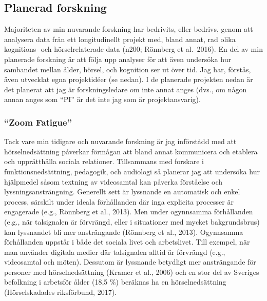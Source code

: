 \documentclass[]{article}
\begin{document}
\hypertarget{planerad-forskning}{%
\subsection{Planerad forskning}\label{planerad-forskning}}

Majoriteten av min nuvarande forskning har bedrivits, eller bedrivs,
genom att analysera data från ett longitudinellt projekt med, bland
annat, rad olika kognitions- och hörselrelaterade data (n200; Rönnberg
et al.~2016). En del av min planerade forskning är att följa upp
analyser för att även undersöka hur sambandet mellan ålder, hörsel, och
kognition ser ut över tid. Jag har, förstås, även utvecklat egna
projektidéer (se nedan). I de planerade projekten nedan är det planerat
att jag är forskningsledare om inte annat anges (dvs., om någon annan
anges som ``PI'' är det inte jag som är projektansvarig).

\hypertarget{zoom-fatigue}{%
\subsubsection{``Zoom Fatigue''}\label{zoom-fatigue}}

Tack vare min tidigare och nuvarande forskning är jag införstådd med att
hörselnedsättning påverkar förmågan att bland annat kommunicera och
etablera och upprätthålla sociala relationer. Tillsammans med forskare i
funktionsnedsättning, pedagogik, och audiologi så planerar jag att
undersöka hur hjälpmedel såsom textning av videosamtal kan påverka
förståelse och lyssningsansträngning. Generellt sett är lyssnande en
automatisk och enkel process, särskilt under ideala förhållanden där
inga explicita processer är engagerade (e.g., Rönnberg et al., 2013).
Men under ogynnsamma förhållanden (e.g., när talsignalen är förvrängd,
eller i situationer med mycket bakgrundsbrus) kan lyssnandet bli mer
ansträngande (Rönnberg et al., 2013). Ogynnsamma förhållanden uppstår i
både det sociala livet och arbetslivet. Till exempel, när man använder
digitala medier där talsignalen alltid är förvrängd (e.g., videosamtal
och möten). Dessutom är lyssnande betydligt mer ansträngande för
personer med hörselnedsättning (Kramer et al., 2006) och en stor del av
Sveriges befolkning i arbetsför ålder (18,5 \%) beräknas ha en
hörselnedsättning (Hörselskadades riksförbund, 2017).
\end{document}
